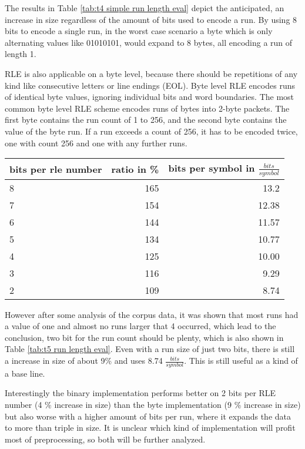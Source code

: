 \par{
The results in Table \ref{tab:t4 simple run length eval} depict the anticipated, an increase in size regardless of the amount of bits used to encode a run. By using 8 bits to encode a single run, in the worst case scenario a byte which is only alternating values like 01010101, would expand to 8 bytes, all encoding a run of length 1.
}

\par{
RLE is also applicable on a byte level, because there should be repetitions of any kind like consecutive letters or line endings (EOL). Byte level RLE encodes runs of identical byte values, ignoring individual bits and word boundaries. The most common byte level RLE scheme encodes runs of bytes into 2-byte packets. The first byte contains the run count of 1 to 256, and the second byte contains the value of the byte run. If a run exceeds a count of 256, it has to be encoded twice, one with count 256 and one with any further runs.
}

\begin{center}
	\begin{tabular}[p]{l|r|r}
		\label{tab:t5 run length eval}
		
		bits per rle number &  ratio in \% & bits per symbol in $\frac{bits}{symbol}$\\
		\hline
		8 & 165 & 13.2 \\
		7 & 154 & 12.38\\
		6 & 144 & 11.57 \\
		5 & 134 & 10.77\\
		4 & 125 & 10.00\\
		3 & 116 & 9.29\\
		2 & 109 & 8.74 \\
	\end{tabular}
\end{center}


\par{
 However after some analysis of the corpus data, it was shown that most runs had a value of one and almost no runs larger that 4 occurred, which lead to the conclusion, two bit for the run count should be plenty, which is also shown in Table \ref{tab:t5 run length eval}.
 Even with a run size of just two bits, there is still a increase in size of about 9\% and uses 8.74 $\frac{bits}{symbol}$. This is still useful as a kind of a base line.
}

\par{
Interestingly the binary implementation performs better on 2 bits per RLE number (4 \% increase in size) than the byte implementation (9 \% increase in size) but also worse with a higher amount of bits per run, where it expands the data to more than triple in size. It is unclear which kind of implementation will profit most of preprocessing, so both will be further analyzed.
}

